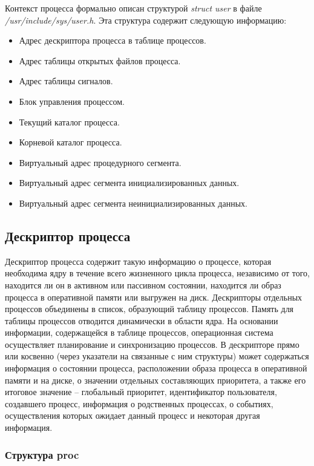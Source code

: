 \documentclass[14pt,a4paper,report]{report}
\begin{document}
Контекст процесса формально описан структурой \emph{struct user} в файле \emph{/usr/include/sys/user.h}. Эта структура содержит следующую информацию:

\begin{itemize}
	\item Адрес дескриптора процесса в таблице процессов.
	\item Адрес таблицы открытых файлов процесса.
	\item Адрес таблицы сигналов.
	\item Блок управления процессом.
	\item Текущий каталог процесса.
	\item Корневой каталог процесса.
	\item Виртуальный адрес процедурного сегмента.
	\item Виртуальный адрес сегмента инициализированных данных.
	\item Виртуальный адрес сегмента неинициализированных данных.
\end{itemize}

\subsection{Дескриптор процесса}

Дескриптор процесса содержит такую информацию о процессе, которая необходима ядру в течение всего жизненного цикла процесса, независимо от того, находится ли он в активном или пассивном состоянии, находится ли образ процесса в оперативной памяти или выгружен на диск. Дескрипторы отдельных процессов объединены в список, образующий таблицу процессов. Память для таблицы процессов отводится динамически в области ядра. На основании информации, содержащейся в таблице процессов, операционная система осуществляет планирование и синхронизацию процессов. В дескрипторе прямо или косвенно (через указатели на связанные с ним структуры) может содержаться информация о состоянии процесса, расположении образа процесса в оперативной памяти и на диске, о значении отдельных составляющих приоритета, а также его итоговое значение – глобальный приоритет, идентификатор пользователя, создавшего процесс, информация о родственных процессах, о событиях, осуществления которых ожидает данный процесс и некоторая другая информация.

\subsubsection{Структура proc}
\end{document}
